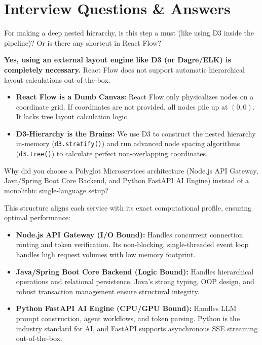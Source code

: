 \documentclass[12pt, a4paper]{article}
\begin{document}
\newpage
\section{Interview Questions \& Answers}

\begin{questionbox}
For making a deep nested hierarchy, is this step a must (like using D3 inside the pipeline)? Or is there any shortcut in React Flow?
\end{questionbox}

\begin{answerbox}[Answer]
\textbf{Yes, using an external layout engine like D3 (or Dagre/ELK) is completely necessary.} React Flow does not support automatic hierarchical layout calculations out-of-the-box.
\begin{itemize}
  \item \textbf{React Flow is a Dumb Canvas:} React Flow only physicalizes nodes on a coordinate grid. If coordinates are not provided, all nodes pile up at $(0,0)$. It lacks tree layout calculation logic.
  \item \textbf{D3-Hierarchy is the Brains:} We use D3 to construct the nested hierarchy in-memory (\texttt{d3.stratify()}) and run advanced node spacing algorithms (\texttt{d3.tree()}) to calculate perfect non-overlapping coordinates.
\end{itemize}
\end{answerbox}

\begin{questionbox}
Why did you choose a Polyglot Microservices architecture (Node.js API Gateway, Java/Spring Boot Core Backend, and Python FastAPI AI Engine) instead of a monolithic single-language setup?
\end{questionbox}

\begin{answerbox}[Answer]
This structure aligns each service with its exact computational profile, ensuring optimal performance:
\begin{itemize}
  \item \textbf{Node.js API Gateway (I/O Bound):} Handles concurrent connection routing and token verification. Its non-blocking, single-threaded event loop handles high request volumes with low memory footprint.
  \item \textbf{Java/Spring Boot Core Backend (Logic Bound):} Handles hierarchical operations and relational persistence. Java's strong typing, OOP design, and robust transaction management ensure structural integrity.
  \item \textbf{Python FastAPI AI Engine (CPU/GPU Bound):} Handles LLM prompt construction, agent workflows, and token parsing. Python is the industry standard for AI, and FastAPI supports asynchronous SSE streaming out-of-the-box.
\end{itemize}
\end{answerbox}
\end{document}
